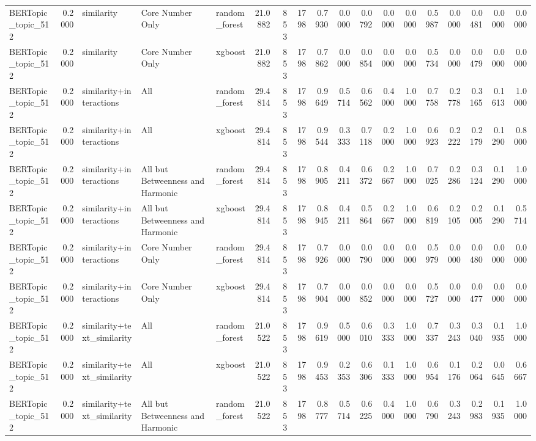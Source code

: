\begin{tabular}{lrlllrrrrrrrrrrrrr}
BERTopic_topic_512 & 0.2000 & similarity & Core Number Only & random_forest & 21.0882 & 853 & 1798 & 0.7930 & 0.0000 & 0.0792 & 0.0000 & 0.0000 & 0.5987 & 0.0000 & 0.0481 & 0.0000 & 0.0000 \\
BERTopic_topic_512 & 0.2000 & similarity & Core Number Only & xgboost & 21.0882 & 853 & 1798 & 0.7862 & 0.0000 & 0.0854 & 0.0000 & 0.0000 & 0.5734 & 0.0000 & 0.0479 & 0.0000 & 0.0000 \\
BERTopic_topic_512 & 0.2000 & similarity+interactions & All & random_forest & 29.4814 & 853 & 1798 & 0.9649 & 0.5714 & 0.6562 & 0.4000 & 1.0000 & 0.7758 & 0.2778 & 0.3165 & 0.1613 & 1.0000 \\
BERTopic_topic_512 & 0.2000 & similarity+interactions & All & xgboost & 29.4814 & 853 & 1798 & 0.9544 & 0.3333 & 0.7118 & 0.2000 & 1.0000 & 0.6923 & 0.2222 & 0.2179 & 0.1290 & 0.8000 \\
BERTopic_topic_512 & 0.2000 & similarity+interactions & All but Betweenness and Harmonic & random_forest & 29.4814 & 853 & 1798 & 0.8905 & 0.4211 & 0.6372 & 0.2667 & 1.0000 & 0.7025 & 0.2286 & 0.3124 & 0.1290 & 1.0000 \\
BERTopic_topic_512 & 0.2000 & similarity+interactions & All but Betweenness and Harmonic & xgboost & 29.4814 & 853 & 1798 & 0.8945 & 0.4211 & 0.5864 & 0.2667 & 1.0000 & 0.6819 & 0.2105 & 0.2005 & 0.1290 & 0.5714 \\
BERTopic_topic_512 & 0.2000 & similarity+interactions & Core Number Only & random_forest & 29.4814 & 853 & 1798 & 0.7926 & 0.0000 & 0.0790 & 0.0000 & 0.0000 & 0.5979 & 0.0000 & 0.0480 & 0.0000 & 0.0000 \\
BERTopic_topic_512 & 0.2000 & similarity+interactions & Core Number Only & xgboost & 29.4814 & 853 & 1798 & 0.7904 & 0.0000 & 0.0852 & 0.0000 & 0.0000 & 0.5727 & 0.0000 & 0.0477 & 0.0000 & 0.0000 \\
BERTopic_topic_512 & 0.2000 & similarity+text_similarity & All & random_forest & 21.0522 & 853 & 1798 & 0.9619 & 0.5000 & 0.6010 & 0.3333 & 1.0000 & 0.7337 & 0.3243 & 0.3040 & 0.1935 & 1.0000 \\
BERTopic_topic_512 & 0.2000 & similarity+text_similarity & All & xgboost & 21.0522 & 853 & 1798 & 0.9453 & 0.2353 & 0.6306 & 0.1333 & 1.0000 & 0.6954 & 0.1176 & 0.2064 & 0.0645 & 0.6667 \\
BERTopic_topic_512 & 0.2000 & similarity+text_similarity & All but Betweenness and Harmonic & random_forest & 21.0522 & 853 & 1798 & 0.8777 & 0.5714 & 0.6225 & 0.4000 & 1.0000 & 0.6790 & 0.3243 & 0.2983 & 0.1935 & 1.0000 \\

\end{tabular}

